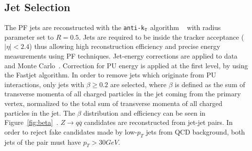 \subsection{Jet Selection}
\label{sec:jetsel}
The PF jets are reconstructed with the {\tt anti-k$_{\tt T}$} algorithm ~\cite{antikt} with radius parameter set to $R=0.5$. Jets are required to be inside the tracker acceptance ($|\eta|<2.4$) thus allowing high reconstruction efficiency and precise energy measurements using PF techniques. Jet-energy corrections are applied to data and Monte Carlo~\cite{CMS-PAS-JME-10-010}. Correction for PU energy is applied at the first level, by using the Fastjet algorithm. In order to remove jets which originate from PU interactions, only jets with $\beta \ge 0.2$ are selected, where $\beta$ is defined as the sum of transverse momenta of all charged particles in the jet coming from the primary vertex, normalized to the total sum of transverse momenta of all charged particles in the jet. The $\beta$ distribution and efficiency can be seen in Figure~\ref{fig:beta}~\cite{2l2q115}. $Z \rightarrow q\overline{q} $ candidates are reconstructed from jet-jet pairs. In order to reject fake candidates made by low-$p_T$ jets from QCD background, both jets of the pair must have $p_T > 30 GeV$.


